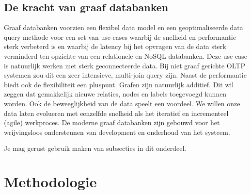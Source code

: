 \subsection{De kracht van graaf databanken}
Graaf databanken voorzien een flexibel data model en een geoptimaliseerde data query methode voor een set van use-cases waarbij de snelheid en performantie sterk verbeterd is en waarbij de latency bij het opvragen van de data sterk verminderd ten opzichte van een relationele en NoSQL databanken. Deze use-case is natuurlijk werken met sterk geconnecteerde data. Bij niet graaf gerichte OLTP systemen zou dit een zeer intensieve, multi-join query zijn. \autocite{graphDatabases}
Naast de performantie biedt ook de flexibiliteit een pluspunt. Grafen zijn natuurlijk additief. Dit wil zeggen dat gemakkelijk nieuwe relaties, nodes en labels toegevoegd kunnen worden.\autocite{graphDatabases}
Ook de beweeglijkheid van de data speelt een voordeel. We willen onze data laten evolueren met eenzelfde snelheid als het iteratief en incrementeel (agile) werkproces. De moderne graaf databanken zijn gebouwd voor het wrijvingsloos ondersteunen van development en onderhoud van het systeem.\autocite{graphDatabases}




Je mag gerust gebruik maken van subsecties in dit onderdeel.

\section{Methodologie}
\label{sec:methodologie}

